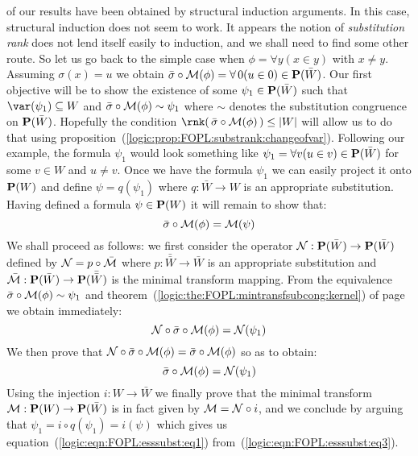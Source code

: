 of our results have been obtained by structural induction arguments.
In this case, structural induction does not seem to work. It appears
the notion of {\em substitution rank} does not lend itself easily to
induction, and we shall need to find some other route. So let us go
back to the simple case when $\phi=\forall y(x\in y)$ with $x\neq
y$. Assuming $\sigma(x)=u$ we obtain $\bar{\sigma}\circ{\cal
M}(\phi)=\forall\,0(u\in 0)\in{\bf P}(\bar{W})$. Our first objective
will be to show the existence of some $\psi_{1}\in{\bf P}(\bar{W})$
such that $\var(\psi_{1})\subseteq W$ and $\bar{\sigma}\circ{\cal
M}(\phi)\sim\psi_{1}$ where $\sim$ denotes the substitution
congruence on ${\bf P}(\bar{W})$. Hopefully the condition
$\rnk(\,\bar{\sigma}\circ{\cal M}(\phi)\,)\leq|W|$ will allow us to
do that using
proposition~(\ref{logic:prop:FOPL:substrank:changeofvar}). Following
our example, the formula $\psi_{1}$ would look something like
$\psi_{1}=\forall v(u\in v)\in{\bf P}(\bar{W})$ for some $v\in W$
and $u\neq v$. Once we have the formula $\psi_{1}$ we can easily
project it onto ${\bf P}(W)$ and define $\psi=q(\psi_{1})$ where
$q:\bar{W}\to W$ is an appropriate substitution. Having defined a
formula $\psi\in{\bf P}(W)$ it will remain to show that:
    \begin{equation}\label{logic:eqn:FOPL:esssubst:eq1}
    \bar{\sigma}\circ{\cal M}(\phi)={\cal M}(\psi)
    \end{equation}
We shall proceed as follows: we first consider the operator ${\cal
N}:{\bf P}(\bar{W})\to{\bf P}(\bar{W})$ defined by ${\cal N}=p\circ
\bar{\cal M}$ where $p:\bar{\bar{W}}\to\bar{W}$ is an appropriate
substitution and $\bar{\cal M}:{\bf P}(\bar{W})\to{\bf
P}(\bar{\bar{W}})$ is the minimal transform mapping. From the
equivalence $\bar{\sigma}\circ{\cal M}(\phi)\sim\psi_{1}$ and
theorem~(\ref{logic:the:FOPL:mintransfsubcong:kernel}) of
page~\pageref{logic:the:FOPL:mintransfsubcong:kernel} we obtain
immediately:
    \begin{equation}\label{logic:eqn:FOPL:esssubst:eq2}
     {\cal N}\circ\bar{\sigma}\circ{\cal M}(\phi)={\cal N}(\psi_{1})
     \end{equation}
We then prove that ${\cal N}\circ\bar{\sigma}\circ{\cal
M}(\phi)=\bar{\sigma}\circ{\cal M}(\phi)$ so as to obtain:
    \begin{equation}\label{logic:eqn:FOPL:esssubst:eq3}
    \bar{\sigma}\circ{\cal M}(\phi)={\cal N}(\psi_{1})
    \end{equation}
Using the injection $i:W\to\bar{W}$ we finally prove that the
minimal transform ${\cal M}:{\bf P}(W)\to{\bf P}(\bar{W})$ is in
fact given by ${\cal M}={\cal N}\circ i$, and we conclude by arguing
that $\psi_{1}=i\circ q(\psi_{1})=i(\psi)$ which gives us
equation~(\ref{logic:eqn:FOPL:esssubst:eq1})
from~(\ref{logic:eqn:FOPL:esssubst:eq3}).

